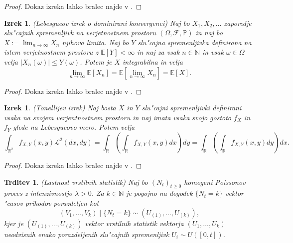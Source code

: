 \documentclass[12pt, a4paper, reqno]{amsart}
\theoremstyle{definition}
\theoremstyle{plain}
\newtheorem{izrek}[definicija]{Izrek}
\newtheorem{trditev}[definicija]{Trditev}
\newcommand{\R}{\mathbb{R}}
\newcommand{\N}{\mathbb{N}}
\newcommand{\E}{\mathbb{E}}
\newcommand{\Prob}{\mathbb{P}}
\newcommand{\1}{\mathds{1}}
\begin{document}
    \begin{proof}
        Dokaz izreka lahko bralec najde v \cite{7}.
    \end{proof}  

    \begin{izrek}(Lebesgueov izrek o dominirani konvergenci)
        Naj bo $X_1, X_2, \dots $ zaporedje slu"cajnih spremenljivk na verjetnostnem prostoru
        $(\Omega, \mathcal{F}, \Prob)$ in naj bo $X:= \lim_{n\to\infty}X_n$ njihova limita.
        Naj bo $Y$ slu"cajna spremenljivka definirana na istem verjetnostnem prostoru z $\E\left[Y\right]<\infty$ in
        naj za vsak $n\in\N$ in vsak $\omega\in\Omega$ velja $|X_n(\omega)| \leq Y(\omega)$. Potem je $X$ integrabilna
        in velja 
        \begin{equation*}
            \lim_{n\to\infty}\E\left[X_n\right] = \E\left[\lim_{n\to\infty}X_n\right] = \E\left[X\right].
        \end{equation*}
        \label{izr:dominiranaKonvergenca}
    \end{izrek}

    \begin{proof}
        Dokaz izreka lahko bralec najde v \cite{7}.
    \end{proof}

    \begin{izrek}(Tonellijev izrek)
        Naj bosta $X$ in $Y$ slu"cajni spremenljivki definirani vsaka na svojem verjentnostnem prostoru
        in naj imata vsaka svojo gostoto $f_X$ in $f_Y$ glede na Lebesgueovo mero.
        Potem velja
        \begin{equation*}
            \int_{\R^2}f_{X, Y}(x, y)\mathcal{L}^2(dx, dy) 
            = \int_{\R}\left(\int_{\R}f_{X, Y}(x, y)dx\right)dy = \int_{\R}\left(\int_{\R}f_{X, Y}(x, y)dy\right)dx.
        \end{equation*}
        \label{izr:TonellijevIzrek}
    \end{izrek}

    \begin{proof}
        Dokaz izreka lahko bralec najde v \cite{7}.
    \end{proof} 

    \begin{trditev}(Lastnost vrstilnih statistik)
        Naj bo $(N_t)_{t\geq0}$ homogeni Poissonov proces z intenzivnostjo $\lambda > 0$. 
        Za $k\in\N$ je pogojno na dogodek $\{N_t = k\}$ vektor "casov prihodov porazdeljen kot 
        \begin{equation*}
            (V_1, \dots, V_k) \mid \{N_t = k\} \sim (U_{(1)}, \dots, U_{(k)}),
        \end{equation*}
        kjer je $(U_{(1)}, \dots, U_{(k)})$ vektor vrstilnih statistik vektorja $(U_1, \dots, U_k)$ 
        neodvisnih \newline enako porazdeljenih slu"cajnih spremenljivk $U_i\sim U\left([0, t]\right)$.
        \label{trd:VrstilneStatistikeHPP}
    \end{trditev}
\end{document}
